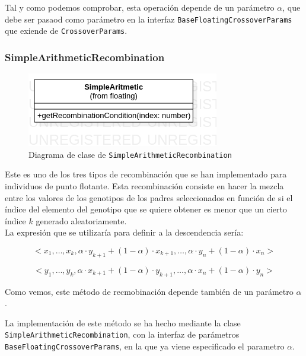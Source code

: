 Tal y como podemos comprobar, esta operación depende de un parámetro $\alpha$, que debe ser pasaod como parámetro en la interfaz \texttt{BaseFloatingCrossoverParams} que exiende de \texttt{CrossoverParams}.

\subsubsection{SimpleArithmeticRecombination}

\begin{figure}[ht]
    \centering
    \includegraphics[scale=0.7]{mem/images/cap-4/4.2.6(Crossover)/SimpleArithmetic.png}
    \caption{Diagrama de clase de \texttt{SimpleArithmeticRecombination}}
    \label{fig:my_label}
\end{figure}


Este es uno de los tres tipos de recombinación que se han implementado para individuos de punto flotante. Esta recombinación consiste en hacer la mezcla entre los valores de los genotipos de los padres seleccionados en función de si el índice del elemento del genotipo que se quiere obtener es menor que un cierto índice $k$ generado aleatoriamente. \\

La expresión que se utilizaría para definir a la descendencia sería:

\begin{equation}
    <x_1, \dots, x_k, \alpha \cdot y_{k+1} + (1 - \alpha) \cdot x_{k+1}, \dots, \alpha \cdot y_n + (1 - \alpha) \cdot x_n >
\end{equation}

\begin{equation}
    <y_1, \dots, y_k, \alpha \cdot x_{k+1} + (1 - \alpha) \cdot y_{k+1}, \dots, \alpha \cdot x_n + (1 - \alpha) \cdot y_n >
\end{equation}

Como vemos, este método de recmobinación depende también de un parámetro $\alpha$. 

La implementación de este método se ha hecho mediante la clase \texttt{SimpleArithmeticRecombination}, con la interfaz de parámetros \texttt{BaseFloatingCrossoverParams}, en la que ya viene especificado el parametro $\alpha$.

